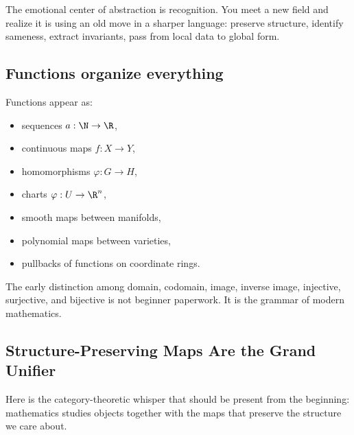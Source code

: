 \begin{aestheticbox}
The emotional center of abstraction is recognition. You meet a new field and
realize it is using an old move in a sharper language: preserve structure,
identify sameness, extract invariants, pass from local data to global form.
\end{aestheticbox}

\subsection{Functions organize everything}

Functions appear as:

\begin{itemize}
\item sequences $a:\N\to\R$,
\item continuous maps $f:X\to Y$,
\item homomorphisms $\varphi:G\to H$,
\item charts $\varphi:U\to\R^n$,
\item smooth maps between manifolds,
\item polynomial maps between varieties,
\item pullbacks of functions on coordinate rings.
\end{itemize}

The early distinction among domain, codomain, image, inverse image, injective,
surjective, and bijective is not beginner paperwork. It is the grammar of modern
mathematics.

\subsection{Structure-Preserving Maps Are the Grand Unifier}

Here is the category-theoretic whisper that should be present from the beginning:
mathematics studies objects together with the maps that preserve the structure we care about.

\begin{center}
\end{center}


